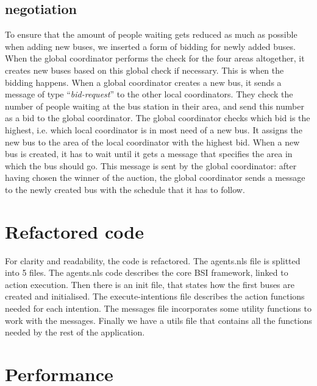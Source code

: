 \documentclass{article}
\begin{document}
\subsection{negotiation}
To ensure that the amount of people waiting gets reduced as much as possible when adding new buses, we inserted a form of bidding for newly added buses. When the global coordinator performs the check for the four areas altogether, it creates new buses based on this global check if necessary. This is when the bidding happens. When a global coordinator creates a new bus, it sends a message of type ``\textit{bid-request}'' to the other local coordinators. They check the number of people waiting at the bus station in their area, and send this number as a bid to the global coordinator. The global coordinator checks which bid is the highest, i.e. which local coordinator is in most need of a new bus. It assigns the new bus to the area of the local coordinator with the highest bid. 
\newline
When a new bus is created, it has to wait until it gets a message that specifies the area in which the bus should go. This message is sent by the global coordinator: after having chosen the winner of the auction, the global coordinator sends a message to the newly created bus with the schedule that it has to follow.

\section{Refactored code}
For clarity and readability, the code is refactored. The agents.nls file is splitted into 5 files. The agents.nls code describes the core BSI framework, linked to action execution. Then there is an init file, that states how the first buses are created and initialised. The execute-intentions file describes the action functions needed for each intention. The messages file incorporates some utility functions to work with the messages. Finally we have a utils file that contains all the functions needed by the rest of the application. 

\section{Performance}



\newpage
\onecolumn


\end{document}
